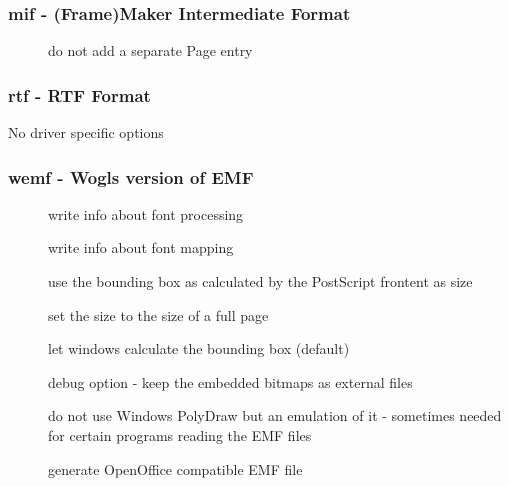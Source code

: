 \documentclass[english,a4paper]{article}
\begin{document}
\subsubsection{mif - (Frame)Maker Intermediate Format}
\begin{description}
\item[] 
do not add a separate Page entry


\end{description}
\subsubsection{rtf - RTF Format}
No driver specific options
\subsubsection{wemf - Wogls version of EMF }
\begin{description}
\item[] 
write info about font processing


\item[] 
write info about font mapping


\item[] 
use the bounding box as calculated by the PostScript frontent as size


\item[] 
set the size to the size of a full page


\item[] 
let windows calculate the bounding box (default)


\item[] 
debug option - keep the embedded bitmaps as external files 


\item[] 
do not use Windows PolyDraw but an emulation of it - sometimes needed for certain programs reading the EMF files


\item[] 
generate OpenOffice compatible EMF file


\end{description}
\end{document}
